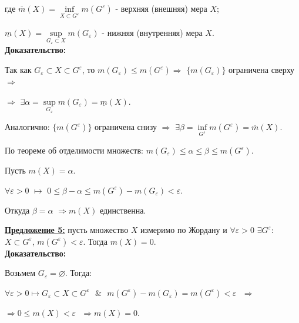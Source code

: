 \documentclass[a4paper,12pt]{article} %
\begin{document}
	\noindent где $\overline{m}(X) = \inf\limits_{X \subset G^{\varepsilon}} m(G^{\varepsilon})$ - верхняя (внешняя) мера $X$;
	
	\noindent $\underline{m}(X) = \sup\limits_{G_{\varepsilon} \subset X} m(G_{\varepsilon})$ - нижняя (внутренняя) мера $X$.\\
	
	\textbf{Доказательство:} 
	
	Так как $G_{\varepsilon} \subset X \subset G^{\varepsilon}$, то $m(G_{\varepsilon}) \leqslant m(G^{\varepsilon}) \Rightarrow$ $\{m(G_{\varepsilon})\}$ ограничена сверху $\Rightarrow$
	
	$\Rightarrow$ $\exists \alpha = \sup\limits_{G_{\varepsilon}} m(G_{\varepsilon}) = \underline{m}(X)$.
	
	Аналогично: $\{m(G^{\varepsilon})\}$ ограничена снизу $\Rightarrow$ $\exists \beta = \inf\limits_{G^{\varepsilon}} m(G^{\varepsilon}) = \overline{m}(X)$.
	
	\vspace{3mm}
	
	По теореме об отделимости множеств: $m(G_{\varepsilon}) \leqslant \alpha \leqslant \beta \leqslant m(G^{\varepsilon})$.
	
	\vspace{3mm}
	Пусть $m(X) = \alpha$.
	
	$\forall \varepsilon > 0$ $\longmapsto$ $0 \leqslant \beta - \alpha \leqslant m(G^{\varepsilon}) - m(G_{\varepsilon}) < \varepsilon$.
	
	Откуда $\beta = \alpha$ $\Rightarrow m(X)$ единственна. 
	
	
	\vspace{3mm}
	
	\underline{\textbf{Предложение 5:}} пусть множество $X$ измеримо по Жордану и $\forall \varepsilon > 0$ $\exists G^{\varepsilon}$: $X \subset G^{\varepsilon}$, $m(G^{\varepsilon}) < \varepsilon$. Тогда $m(X) = 0$.\\
	
	\textbf{Доказательство:} 
	
	Возьмем $G_{\varepsilon} = \varnothing$. Тогда:
	
	$\forall \varepsilon > 0 \longmapsto G_{\varepsilon} \subset X \subset G^{\varepsilon} \text{ } \& \text{ } m(G^{\varepsilon}) - m(G_{\varepsilon}) = m(G^{\varepsilon}) < \varepsilon \text{ } \Rightarrow$ 
	
	$\Rightarrow 0 \leqslant m(X) < \varepsilon \text{ } \Rightarrow m(X) = 0$.
	
	\vspace{3mm}
	
\end{document}
